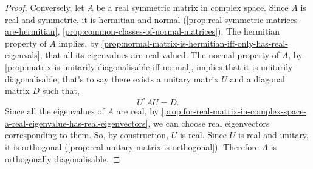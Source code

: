 \documentclass[../MathsNotesBase.tex]{subfiles}
\begin{document}
{\begin{proof}
			Conversely, let $A$ be a real symmetric matrix in complex space. Since $A$ is real and symmetric, it is hermitian and normal (\autoref{prop:real-symmetric-matrices-are-hermitian}, \autoref{prop:common-classes-of-normal-matrices}). The hermitian property of $A$ implies, by \autoref{prop:normal-matrix-is-hermitian-iff-only-has-real-eigenvals}, that all its eigenvalues are real-valued. The normal property of $A$, by \autoref{prop:matrix-is-unitarily-diagonalisable-iff-normal}, implies that it is unitarily diagonalisable; that's to say there exists a unitary matrix $U$ and a diagonal matrix $D$ such that,
			\[ U^* A U = D. \]
			Since all the eigenvalues of $A$ are real, by \autoref{prop:for-real-matrix-in-complex-space-a-real-eigenvalue-has-real-eigenvectors}, we can choose real eigenvectors corresponding to them. So, by construction, $U$ is real. Since $U$ is real and unitary, it is orthogonal (\autoref{prop:real-unitary-matrix-is-orthogonal}). Therefore $A$ is orthogonally diagonalisable.
		\end{proof}


		
		
}
\end{document}
